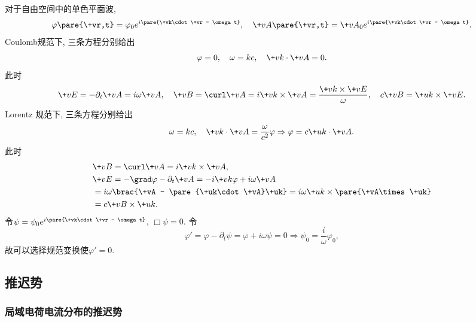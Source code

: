 \documentclass[hidelinks]{ctexart}
\begin{document}
\begin{ex}
    对于自由空间中的单色平面波,
    \[ \varphi\pare{\+vr,t} = \varphi_0 e^{i\pare{\+vk\cdot \+vr - \omega t}},\quad \+vA\pare{\+vr,t} = \+vA_0 e^{i\pare{\+vk\cdot \+vr - \omega t}}. \]
    Coulomb规范下, 三条方程分别给出
    \[ \varphi = 0,\quad \omega = kc,\quad \+vk\cdot \+vA = 0. \]
    此时
    \[ \+vE = -\partial_t \+vA = i\omega \+vA,\quad \+vB = \curl \+vA = i\+vk\times \+vA = \frac{\+vk\times \+vE}{\omega},\quad c\+vB = \+uk\times \+vE. \]
    Lorentz 规范下, 三条方程分别给出
    \[ \omega = kc,\quad \+vk\cdot \+vA = \frac{\omega}{c^2}\varphi \Rightarrow \varphi = c\+uk\cdot \+vA. \]
    此时
    \begin{align*}
        & \+vB = \curl \+vA = i\+vk\times \+vA,\\
        & \+vE = -\grad \varphi - \partial_t \+vA = -i\+vk\varphi + i\omega \+vA\\
        & = i\omega\brac{\+vA - \pare{\+uk\cdot \+vA}\+uk} = i\omega\+uk\times \pare{\+vA\times \+uk}\\
        &= c\+vB\times \+uk.
    \end{align*}
    令$\psi = \psi_0 e^{i\pare{\+vk\cdot \+vr - \omega t}}$, $\Box{}\psi = 0$. 令
    \[ \varphi' = \varphi - \partial_t\psi = \varphi + i\omega\psi = 0 \Rightarrow \psi_0 = \frac{i}{\omega}\varphi_0, \]
    故可以选择规范变换使$\varphi' = 0$.
\end{ex}



\subsection{推迟势} %
\label{sub:推迟势}

\subsubsection{局域电荷电流分布的推迟势} %
\label{ssub:推迟势}
\end{document}
